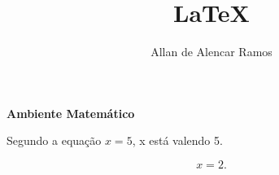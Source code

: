 \documentclass[12pt, a4paper]{article}
\begin{document}
\title{LaTeX}
\author{Allan de Alencar Ramos}
\maketitle

\begin{center}
\large\textbf{Ambiente Matemático}
\end{center}
\vspace{0.5cm}


Segundo a equação $ x = 5 $, x está valendo 5.

\begin{equation}
x = 2.
\end{equation}
\end{document}
